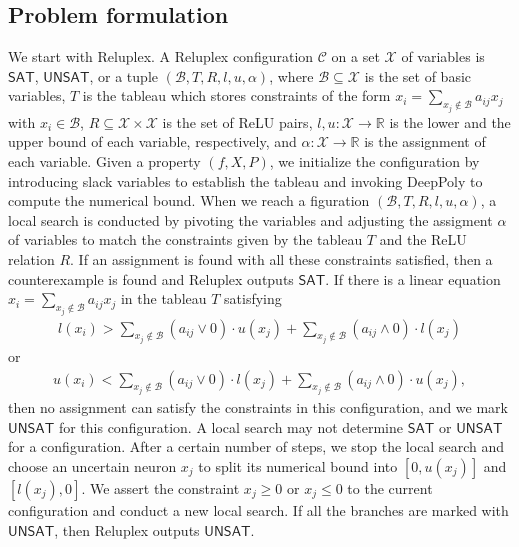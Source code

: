 \documentclass[runningheads]{llncs}
\begin{document}
\subsection{Problem formulation}
We start with Reluplex. 
A Reluplex configuration $\mathcal C$ on a set $\mathcal X$ of variables is $\mathsf{SAT}$, $\mathsf{UNSAT}$, or a tuple $(\mathcal B,T,R,l,u,\alpha)$, where $\mathcal B \subseteq \mathcal X$ is the set of basic variables, $T$ is the tableau which stores constraints of the form $x_i=\sum_{x_j \not \in \mathcal B} a_{ij}x_j$ with $x_i \in \mathcal B$, $R \subseteq \mathcal X \times \mathcal X$ is the set of ReLU pairs, $l,u:\mathcal X \to \mathbb R$ is the lower and the upper bound of each variable, respectively, and $\alpha:\mathcal X \to \mathbb R$ is the assignment of each variable. 
Given a property $(f,X,P)$, we initialize the configuration by introducing slack variables to establish the tableau and invoking DeepPoly to compute the numerical bound. 
When we reach a figuration $(\mathcal B,T,R,l,u,\alpha)$, a local search is conducted by pivoting the variables and adjusting the assigment $\alpha$ of variables to match the constraints given by the tableau $T$ and the ReLU relation $R$. 
If an assignment is found with all these constraints satisfied, then a counterexample is found and Reluplex outputs $\mathsf{SAT}$. 
If  there is a linear equation $x_i=\sum_{x_j \not \in \mathcal B} a_{ij}x_j$ in the tableau $T$ satisfying 
\begin{align} \label{eq:unsat1}
l(x_i)>\sum_{x_j \not \in \mathcal B} (a_{ij} \vee 0) \cdot u(x_j)+\sum_{x_j \not \in \mathcal B} (a_{ij} \wedge 0) \cdot l(x_j)
\end{align}
or
\begin{align}\label{eq:unsat2}
u(x_i)<\sum_{x_j \not \in \mathcal B} (a_{ij} \vee 0) \cdot l(x_j)+\sum_{x_j \not \in \mathcal B} (a_{ij} \wedge 0) \cdot u(x_j),
\end{align}
then no assignment can satisfy the constraints in this configuration, and we mark $\mathsf{UNSAT}$ for this configuration.
A local search may not determine $\mathsf{SAT}$ or $\mathsf{UNSAT}$ for a configuration. After a certain number of steps, we stop the local search and choose an uncertain neuron $x_j$ to split its numerical bound into $[0,u(x_j)]$ and $[l(x_j),0]$. We assert the constraint $x_j \ge 0$ or $x_j \le 0$ to the current configuration and conduct a new local search. If all the branches are marked with $\mathsf{UNSAT}$, then Reluplex outputs $\mathsf{UNSAT}$.
\end{document}

